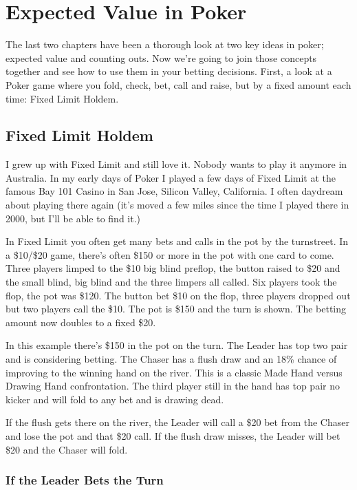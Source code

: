 \chapter{Expected Value in Poker}

The last two chapters have been a thorough look at two key ideas in
poker; expected value and counting outs. Now we're going to join
those concepts together and see how to use them in your betting
decisions. First, a look at a Poker game where you fold, check, bet,
call and raise, but by a fixed amount each time: Fixed Limit Holdem.

\section{Fixed Limit Holdem}

I grew up with Fixed Limit and still love it. Nobody wants to play it
anymore in Australia. In my early days of Poker I played a few days of
Fixed Limit at the famous Bay 101 Casino in San Jose, Silicon Valley,
California. I often daydream about playing there again (it's moved a
few miles since the time I played there in 2000, but I'll be able to
find it.)

In Fixed Limit you often get many bets and calls in the pot by the
turnstreet. In a \$10/\$20 game, there's often \$150 or more in the
pot with one card to come. Three players limped to the
\$10 big blind preflop, the button raised to \$20 and the small blind,
big blind and the three limpers all called. Six players took the flop,
the pot was \$120. The button bet \$10 on the flop, three players
dropped out but two players call the \$10. The pot is \$150 and the turn is
shown. The betting amount now doubles to a fixed \$20.

In this example there's \$150 in the pot on the turn. The Leader has
top two pair and is considering betting. The Chaser has a flush draw
and an 18\% chance of improving to the winning hand on the river.
This is a classic Made Hand versus Drawing Hand confrontation.
The third player still in the hand has top pair no kicker and will
fold to any bet and is drawing dead.

If the flush gets there on the river, the Leader will call a \$20 bet
from the Chaser and lose the pot and that \$20 call. If the flush draw
misses, the Leader will bet \$20 and the Chaser will fold.

\subsection{If the Leader Bets the Turn}

